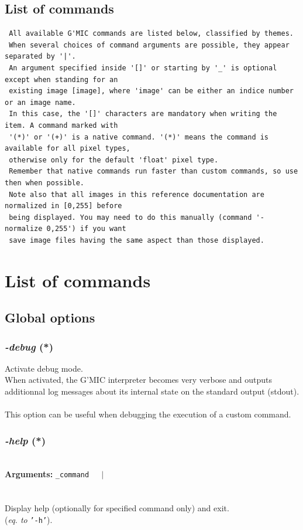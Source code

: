 \documentclass[a4paper,11pt,twoside]{book}
\begin{document}
\section{List of commands}
\small
\begin{lstlisting}
 All available G'MIC commands are listed below, classified by themes. 
 When several choices of command arguments are possible, they appear separated by '|'. 
 An argument specified inside '[]' or starting by '_' is optional except when standing for an 
 existing image [image], where 'image' can be either an indice number or an image name. 
 In this case, the '[]' characters are mandatory when writing the item. A command marked with 
 '(*)' or '(+)' is a native command. '(*)' means the command is available for all pixel types, 
 otherwise only for the default 'float' pixel type. 
 Remember that native commands run faster than custom commands, so use then when possible. 
 Note also that all images in this reference documentation are normalized in [0,255] before 
 being displayed. You may need to do this manually (command '-normalize 0,255') if you want 
 save image files having the same aspect than those displayed.
\end{lstlisting}
\normalsize

\chapter{List of commands}

\section{Global options}


\subsection{\emph{-debug} (*)}\vspace*{-0.5em}
Activate debug mode.
~\\When activated, the G'MIC interpreter becomes very verbose and outputs additionnal log
messages about its internal state on the standard output (stdout).
~\\This option can be useful when debugging the execution of a custom command.


\subsection{\emph{-help} (*)}\vspace*{-0.5em}
~\\\textbf{Arguments: } 
{\small \texttt{\_command}}~~~$|$\\
\\~\\
Display help (optionally for specified command only) and exit.
~\\(\emph{eq. to} {\small \texttt{'-h'}}).
\end{document}
